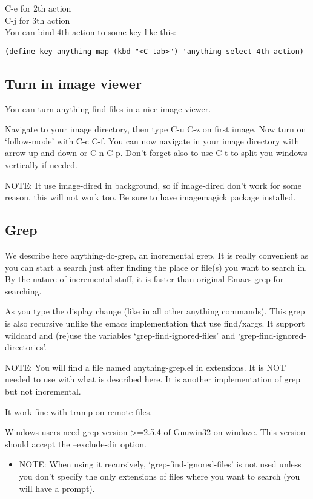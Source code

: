 \documentclass[a4paper,11pt]{article}
\begin{document}
C-e for 2th action\\
C-j for 3th action\\

You can bind 4th action to some key like this:
\begin{verbatim}
(define-key anything-map (kbd "<C-tab>") 'anything-select-4th-action)
\end{verbatim}
 
\subsection{Turn in image viewer}
\label{sec:turn-image-viewer}
You can turn anything-find-files in a nice image-viewer.

Navigate to your image directory, then type C-u C-z on first image.
Now turn on `follow-mode' with C-c C-f.
You can now navigate in your image directory with arrow up and down or C-n C-p.
Don't forget also to use C-t to split you windows vertically if needed.

NOTE:
It use image-dired in background, so if image-dired don't work for some reason, this will
not work too.
Be sure to have imagemagick package installed.

\subsection{Grep}
\label{sec:grep}
We describe here anything-do-grep, an incremental grep.
It is really convenient as you can start a search just after finding the place or file(s) you want to search in.
By the nature of incremental stuff, it is faster than original Emacs grep for searching.

As you type the display change (like in all other anything commands).
This grep is also recursive unlike the emacs implementation that use find/xargs.
It support wildcard and (re)use the variables `grep-find-ignored-files'
and `grep-find-ignored-directories'.

NOTE: You will find a file named anything-grep.el in extensions.
It is NOT needed to use with what is described here.
It is another implementation of grep but not incremental.

It work fine with tramp on remote files.

Windows users need grep version >=2.5.4 of Gnuwin32 on windoze.
This version should accept the --exclude-dir option.

\begin{itemize}
\item NOTE:
When using it recursively, `grep-find-ignored-files' is not used unless you don't specify
the only extensions of files where you want to search (you will have a prompt).
\end{itemize}
\end{document}
